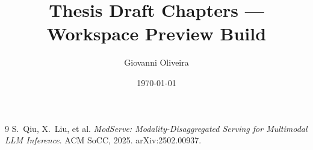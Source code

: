 \documentclass[12pt,a4paper]{book}
\title{Thesis Draft Chapters --- Workspace Preview Build}
\author{Giovanni Oliveira}
\date{\today}
\begin{document}
\maketitle
\tableofcontents




\begin{thebibliography}{9}
S.~Qiu, X.~Liu, et al.
\emph{ModServe: Modality-Disaggregated Serving for Multimodal LLM Inference}.
ACM SoCC, 2025. arXiv:2502.00937.
\end{thebibliography}
\end{document}
